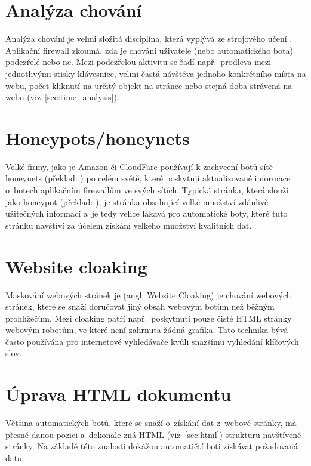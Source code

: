 \section*{Analýza chování}
Analýza chování je velmi složitá disciplína, která vyplývá ze strojového učení \cite{bib:behaviorAnalysis}. Aplikační firewall zkoumá, zda je chování uživatele (nebo automatického bota) podezřelé nebo ne. Mezi podezřelou aktivitu se řadí např.~prodleva mezi jednotlivými stisky klávesnice, velmi častá návštěva jednoho konkrétního místa na webu, počet kliknutí na určitý objekt na stránce nebo stejná doba strávená na webu (viz~\ref{sec:time_analysis}). 

\section*{Honeypots/honeynets}
Velké firmy, jako je Amazon či CloudFare používají k zachycení botů sítě honeynets (překlad:  ) po celém světě, které poskytují aktualizované informace o~botech aplikačním firewallům ve svých sítích. Typická stránka, která slouží jako honeypot (překlad:  ), je stránka obsahující velké množství zdánlivě užitečných informací a~je tedy velice lákavá pro automatické boty, které tuto stránku navštíví za účelem získání velkého množství kvalitních dat. 

\section*{Website cloaking}
Maskování webových stránek je (angl. Website Cloaking) je chování webových stránek, které se snaží doručovat jiný obsah webovým botům než běžným prohlížečům. Mezi cloaking patří např.~poskytnutí pouze čisté HTML stránky webovým robotům, ve které není zahrnuta žádná grafika. Tato technika bývá často používána pro internetové vyhledávače kvůli snazšímu vyhledání klíčových slov.

\section{Úprava HTML dokumentu}
Většina automatických botů, které se snaží o~získání dat z~webové stránky, má přesně danou pozici a~dokonale zná HTML (viz~\ref{sec:html}) strukturu navštívené stránky. Na základě této znalosti dokážou automatičtí boti získávat požadovaná data. 

